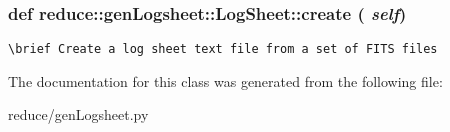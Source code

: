 \subsubsection{\setlength{\rightskip}{0pt plus 5cm}def reduce::gen\-Logsheet::Log\-Sheet::create ( {\em self})}\label{classreduce_1_1genLogsheet_1_1LogSheet_0a1f8acc4d72b1d27d8ab2fd604e2a75}




\footnotesize\begin{verbatim}
\brief Create a log sheet text file from a set of FITS files
\end{verbatim}
\normalsize
 

The documentation for this class was generated from the following file:\begin{CompactItemize}
\item 
reduce/gen\-Logsheet.py\end{CompactItemize}
